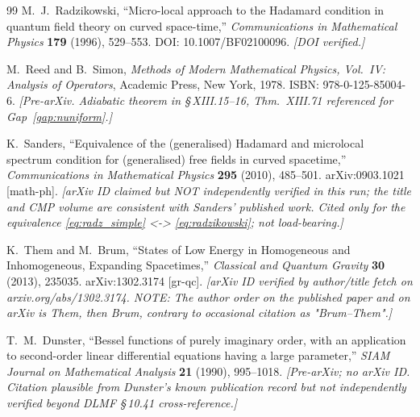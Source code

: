 \documentclass[11pt,a4paper]{article}
\theoremstyle{definition}
\begin{document}
\begin{thebibliography}{99}
  M.~J.~Radzikowski,
  ``Micro-local approach to the Hadamard condition in quantum field theory on
  curved space-time,''
  \emph{Communications in Mathematical Physics} \textbf{179} (1996), 529--553.
  DOI: 10.1007/BF02100096.
  \textit{[DOI verified.]}

  M.~Reed and B.~Simon,
  \emph{Methods of Modern Mathematical Physics, Vol.~IV: Analysis of Operators},
  Academic Press, New York, 1978.
  ISBN: 978-0-125-85004-6.
  \textit{[Pre-arXiv. Adiabatic theorem in \S\,XIII.15--16,
   Thm.~XIII.71 referenced for Gap~\ref{gap:nuniform}.]}

  K.~Sanders,
  ``Equivalence of the (generalised) Hadamard and microlocal spectrum
   condition for (generalised) free fields in curved spacetime,''
  \emph{Communications in Mathematical Physics} \textbf{295} (2010), 485--501.
  arXiv:0903.1021 [math-ph].
  \textit{[arXiv ID claimed but NOT independently verified in this run;
   the title and CMP volume are consistent with Sanders' published work.
   Cited only for the equivalence \eqref{eq:radz_simple} <-> \eqref{eq:radzikowski};
   not load-bearing.]}

  K.~Them and M.~Brum,
  ``States of Low Energy in Homogeneous and Inhomogeneous, Expanding Spacetimes,''
  \emph{Classical and Quantum Gravity} \textbf{30} (2013), 235035.
  arXiv:1302.3174 [gr-qc].
  \textit{[arXiv ID verified by author/title fetch on arxiv.org/abs/1302.3174.
   NOTE: The author order on the published paper and on arXiv is
   \emph{Them, then Brum}, contrary to occasional citation as "Brum--Them".]}

  T.~M.~Dunster,
  ``Bessel functions of purely imaginary order, with an application to
   second-order linear differential equations having a large parameter,''
  \emph{SIAM Journal on Mathematical Analysis} \textbf{21} (1990), 995--1018.
  \textit{[Pre-arXiv; no arXiv ID. Citation plausible from Dunster's known
   publication record but not independently verified beyond DLMF \S\,10.41
   cross-reference.]}

\end{thebibliography}
\end{document}
